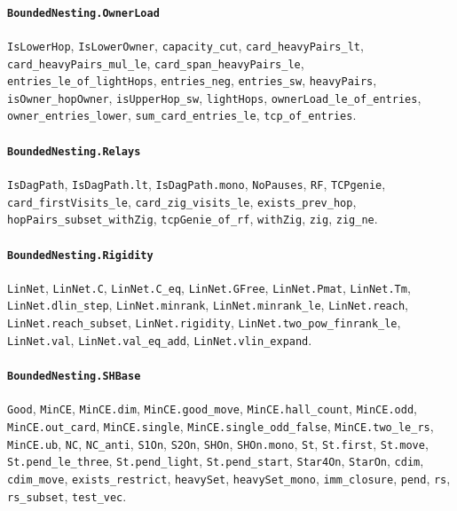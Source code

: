 \paragraph{\texttt{BoundedNesting.OwnerLoad}}
{\small\raggedright \texttt{IsLowerHop}, \texttt{IsLowerOwner}, \texttt{capacity\_cut}, \texttt{card\_heavyPairs\_lt}, \texttt{card\_heavyPairs\_mul\_le}, \texttt{card\_span\_heavyPairs\_le}, \texttt{entries\_le\_of\_lightHops}, \texttt{entries\_neg}, \texttt{entries\_sw}, \texttt{heavyPairs}, \texttt{isOwner\_hopOwner}, \texttt{isUpperHop\_sw}, \texttt{lightHops}, \texttt{ownerLoad\_le\_of\_entries}, \texttt{owner\_entries\_lower}, \texttt{sum\_card\_entries\_le}, \texttt{tcp\_of\_entries}.\par}

\paragraph{\texttt{BoundedNesting.Relays}}
{\small\raggedright \texttt{IsDagPath}, \texttt{IsDagPath.lt}, \texttt{IsDagPath.mono}, \texttt{NoPauses}, \texttt{RF}, \texttt{TCPgenie}, \texttt{card\_firstVisits\_le}, \texttt{card\_zig\_visits\_le}, \texttt{exists\_prev\_hop}, \texttt{hopPairs\_subset\_withZig}, \texttt{tcpGenie\_of\_rf}, \texttt{withZig}, \texttt{zig}, \texttt{zig\_ne}.\par}

\paragraph{\texttt{BoundedNesting.Rigidity}}
{\small\raggedright \texttt{LinNet}, \texttt{LinNet.C}, \texttt{LinNet.C\_eq}, \texttt{LinNet.GFree}, \texttt{LinNet.Pmat}, \texttt{LinNet.Tm}, \texttt{LinNet.dlin\_step}, \texttt{LinNet.minrank}, \texttt{LinNet.minrank\_le}, \texttt{LinNet.reach}, \texttt{LinNet.reach\_subset}, \texttt{LinNet.rigidity}, \texttt{LinNet.two\_pow\_finrank\_le}, \texttt{LinNet.val}, \texttt{LinNet.val\_eq\_add}, \texttt{LinNet.vlin\_expand}.\par}

\paragraph{\texttt{BoundedNesting.SHBase}}
{\small\raggedright \texttt{Good}, \texttt{MinCE}, \texttt{MinCE.dim}, \texttt{MinCE.good\_move}, \texttt{MinCE.hall\_count}, \texttt{MinCE.odd}, \texttt{MinCE.out\_card}, \texttt{MinCE.single}, \texttt{MinCE.single\_odd\_false}, \texttt{MinCE.two\_le\_rs}, \texttt{MinCE.ub}, \texttt{NC}, \texttt{NC\_anti}, \texttt{S1On}, \texttt{S2On}, \texttt{SHOn}, \texttt{SHOn.mono}, \texttt{St}, \texttt{St.first}, \texttt{St.move}, \texttt{St.pend\_le\_three}, \texttt{St.pend\_light}, \texttt{St.pend\_start}, \texttt{Star4On}, \texttt{StarOn}, \texttt{cdim}, \texttt{cdim\_move}, \texttt{exists\_restrict}, \texttt{heavySet}, \texttt{heavySet\_mono}, \texttt{imm\_closure}, \texttt{pend}, \texttt{rs}, \texttt{rs\_subset}, \texttt{test\_vec}.\par}

